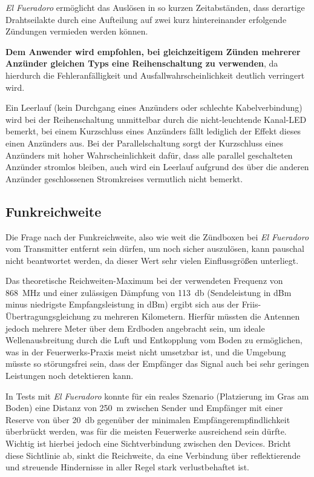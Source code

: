\documentclass[paper=a4, parskip, numbers=noenddot, toc=listof, headsepline]{scrbook}
\newcommand{\anlage}{\emph{El Fueradoro}}
\begin{document}
					{\anlage} ermöglicht das Auslösen in so kurzen Zeitabständen, dass derartige Drahtseilakte durch eine Aufteilung auf zwei kurz hintereinander erfolgende Zündungen vermieden werden können.

					\textbf{Dem Anwender wird empfohlen, bei gleichzeitigem Zünden mehrerer Anzünder gleichen Typs eine Reihenschaltung zu verwenden}, da hierdurch die Fehleranfälligkeit und Ausfallwahrscheinlichkeit deutlich verringert wird.

					Ein Leerlauf (kein Durchgang eines Anzünders oder schlechte Kabelverbindung) wird bei der Reihenschaltung unmittelbar durch die nicht-leuchtende Kanal-LED bemerkt, bei einem Kurzschluss eines Anzünders fällt lediglich der Effekt dieses einen Anzünders aus. Bei der Parallelschaltung sorgt der Kurzschluss eines Anzünders mit hoher Wahrscheinlichkeit dafür, dass alle parallel geschalteten Anzünder stromlos bleiben, auch wird ein Leerlauf aufgrund des über die anderen Anzünder geschlossenen Stromkreises vermutlich nicht bemerkt.

				\subsection{Funkreichweite}

					Die Frage nach der Funkreichweite, also wie weit die Zündboxen bei {\anlage} vom Transmitter entfernt sein dürfen, um noch sicher auszulösen, kann pauschal nicht beantwortet werden, da dieser Wert sehr vielen Einflussgrößen unterliegt.

					Das theoretische Reichweiten-Maximum bei der verwendeten Frequenz von \SI{868}{\mega\hertz} und einer zulässigen Dämpfung von \SI{113}{\decibel} (Sendeleistung in dBm minus niedrigste Empfangsleistung in dBm) ergibt sich aus der Friis-Übertragungsgleichung zu mehreren Kilometern. Hierfür müssten die Antennen jedoch mehrere Meter über dem Erdboden angebracht sein, um ideale Wellenausbreitung durch die Luft und Entkopplung vom Boden zu ermöglichen, was in der Feuerwerks-Praxis meist nicht umsetzbar ist, und die Umgebung müsste so störungsfrei sein, dass der Empfänger das Signal auch bei sehr geringen Leistungen noch detektieren kann.

					In Tests mit {\anlage} konnte für ein reales Szenario (Platzierung im Gras am Boden) eine Distanz von \SI{250}{\meter} zwischen Sender und Empfänger mit einer Reserve von über \SI{20}{\decibel} gegenüber der minimalen Empfänger\-empfindlichkeit überbrückt werden, was für die meisten Feuerwerke ausreichend sein dürfte. Wichtig ist hierbei jedoch eine Sichtverbindung zwischen den Devices. Bricht diese Sichtlinie ab, sinkt die Reichweite, da eine Verbindung über reflektierende und streuende Hindernisse in aller Regel stark verlustbehaftet ist.
\end{document}
